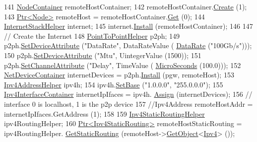 \begin{DoxyCode}
141         \hyperlink{classns3_1_1NodeContainer}{NodeContainer} remoteHostContainer;
142         remoteHostContainer.\hyperlink{classns3_1_1NodeContainer_a787f059e2813e8b951cc6914d11dfe69}{Create} (1);
143         \hyperlink{classns3_1_1Ptr}{Ptr<Node>} remoteHost = remoteHostContainer.\hyperlink{classns3_1_1NodeContainer_a9ed96e2ecc22e0f5a3d4842eb9bf90bf}{Get} (0);
144         \hyperlink{classns3_1_1InternetStackHelper}{InternetStackHelper} internet;
145         internet.\hyperlink{classns3_1_1InternetStackHelper_a6645b412f31283d2d9bc3d8a95cebbc0}{Install} (remoteHostContainer);
146 
147         \textcolor{comment}{// Create the Internet}
148         \hyperlink{classns3_1_1PointToPointHelper}{PointToPointHelper} p2ph;
149         p2ph.\hyperlink{classns3_1_1PointToPointHelper_a4577f5ab8c387e5528af2e0fbab1152e}{SetDeviceAttribute} (\textcolor{stringliteral}{"DataRate"}, DataRateValue (
      \hyperlink{classns3_1_1DataRate}{DataRate} (\textcolor{stringliteral}{"100Gb/s"})));
150         p2ph.\hyperlink{classns3_1_1PointToPointHelper_a4577f5ab8c387e5528af2e0fbab1152e}{SetDeviceAttribute} (\textcolor{stringliteral}{"Mtu"}, UintegerValue (1500));
151         p2ph.\hyperlink{classns3_1_1PointToPointHelper_a6b5317fd17fb61e5a53f8d66a90b63b9}{SetChannelAttribute} (\textcolor{stringliteral}{"Delay"}, TimeValue (
      \hyperlink{group__timecivil_ga17465a639c8d1464e76538afdd78a9f0}{MicroSeconds} (100.0)));
152         \hyperlink{classns3_1_1NetDeviceContainer}{NetDeviceContainer} internetDevices = p2ph.\hyperlink{classns3_1_1PointToPointHelper_ab9162fea3e88722666fed1106df1f9ec}{Install} (pgw, remoteHost);
153         \hyperlink{classns3_1_1Ipv4AddressHelper}{Ipv4AddressHelper} ipv4h;
154         ipv4h.\hyperlink{classns3_1_1Ipv4AddressHelper_acf7b16dd25bac67e00f5e25f90a9a035}{SetBase} (\textcolor{stringliteral}{"1.0.0.0"}, \textcolor{stringliteral}{"255.0.0.0"});
155         \hyperlink{classns3_1_1Ipv4InterfaceContainer}{Ipv4InterfaceContainer} internetIpIfaces = ipv4h.
      \hyperlink{classns3_1_1Ipv4AddressHelper_af8e7f4a1a7e74c00014a1eac445a27af}{Assign} (internetDevices);
156         \textcolor{comment}{// interface 0 is localhost, 1 is the p2p device}
157         \textcolor{comment}{//Ipv4Address remoteHostAddr = internetIpIfaces.GetAddress (1);}
158 
159         \hyperlink{classns3_1_1Ipv4StaticRoutingHelper}{Ipv4StaticRoutingHelper} ipv4RoutingHelper;
160         \hyperlink{classns3_1_1Ptr}{Ptr<Ipv4StaticRouting>} remoteHostStaticRouting = ipv4RoutingHelper.
      \hyperlink{classns3_1_1Ipv4StaticRoutingHelper_a731206e50d305695dac7fb2ef963a4bb}{GetStaticRouting} (remoteHost->\hyperlink{classns3_1_1Object_a13e18c00017096c8381eb651d5bd0783}{GetObject}<\hyperlink{classns3_1_1Ipv4}{Ipv4}> ());

\end{DoxyCode}
